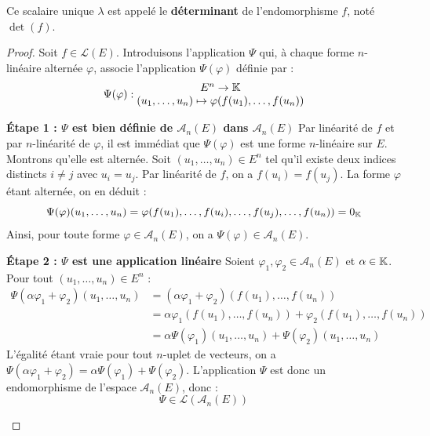 \documentclass[12pt, a4paper]{report}
\begin{document}
\begin{definition}
    Ce scalaire unique $\lambda$ est appelé le \textbf{déterminant} de l'endomorphisme $f$, noté $\det(f)$.
\end{definition}

\begin{proof}
    Soit $f \in \mathcal{L}(E)$. Introduisons l'application $\Psi$ qui, à chaque forme $n$-linéaire alternée $\varphi$, associe l'application $\Psi(\varphi)$ définie par :
    $$\Psi(\varphi) : \begin{matrix} E^n \to \mathbb{K} \\ (u_1, \dots, u_n) \mapsto \varphi(f(u_1), \dots, f(u_n)) \end{matrix}$$

    \begin{outline}
        \1 \textbf{Étape 1 : $\Psi$ est bien définie de $\mathscr{A}_n(E)$ dans $\mathscr{A}_n(E)$}
        \2 Par linéarité de $f$ et par $n$-linéarité de $\varphi$, il est immédiat que $\Psi(\varphi)$ est une forme $n$-linéaire sur $E$.
        \2 Montrons qu'elle est alternée. Soit $(u_1, \dots, u_n) \in E^n$ tel qu'il existe deux indices distincts $i \neq j$ avec $u_i = u_j$. Par linéarité de $f$, on a $f(u_i) = f(u_j)$. La forme $\varphi$ étant alternée, on en déduit :
        $$\Psi(\varphi)(u_1, \dots, u_n) = \varphi(f(u_1), \dots, f(u_i), \dots, f(u_j), \dots, f(u_n)) = 0_{\mathbb{K}}$$
        Ainsi, pour toute forme $\varphi \in \mathscr{A}_n(E)$, on a $\Psi(\varphi) \in \mathscr{A}_n(E)$.

        \1 \textbf{Étape 2 : $\Psi$ est une application linéaire}
        \2 Soient $\varphi_1, \varphi_2 \in \mathscr{A}_n(E)$ et $\alpha \in \mathbb{K}$. Pour tout $(u_1, \dots, u_n) \in E^n$ :
        \begin{align*}
            \Psi(\alpha \varphi_1 + \varphi_2)(u_1, \dots, u_n) &= (\alpha \varphi_1 + \varphi_2)(f(u_1), \dots, f(u_n)) \\
            &= \alpha \varphi_1(f(u_1), \dots, f(u_n)) + \varphi_2(f(u_1), \dots, f(u_n)) \\
            &= \alpha \Psi(\varphi_1)(u_1, \dots, u_n) + \Psi(\varphi_2)(u_1, \dots, u_n)
        \end{align*}
        L'égalité étant vraie pour tout $n$-uplet de vecteurs, on a $\Psi(\alpha \varphi_1 + \varphi_2) = \alpha \Psi(\varphi_1) + \Psi(\varphi_2)$. L'application $\Psi$ est donc un endomorphisme de l'espace $\mathscr{A}_n(E)$, donc :
        $$\Psi \in \mathcal{L}(\mathscr{A}_n(E))$$


\end{outline}
\end{proof}
\end{document}
